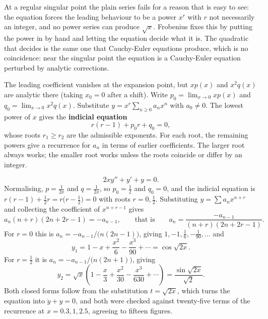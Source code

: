 At a regular singular point the plain series fails for a reason that is easy to see: the equation forces the leading behaviour to be a power $x^{r}$ with $r$ not necessarily an integer, and no power series can produce $\sqrt{x}$. Frobenius fixes this by putting the power in by hand and letting the equation decide what it is. The quadratic that decides is the same one that Cauchy-Euler equations produce, which is no coincidence: near the singular point the equation is a Cauchy-Euler equation perturbed by analytic corrections.

\cue The leading coefficient vanishes at the expansion point, but $xp(x)$ and $x^{2}q(x)$ are analytic there (taking $x_0=0$ after a shift).
\method Write $p_0=\lim_{x\to0}xp(x)$ and $q_0=\lim_{x\to0}x^{2}q(x)$. Substitute $y=x^{r}\sum_{n\ge0}a_nx^{n}$ with $a_0\ne0$. The lowest power of $x$ gives the \textbf{indicial equation}
\[r(r-1)+p_0r+q_0=0,\]
whose roots $r_1\ge r_2$ are the admissible exponents. For each root, the remaining powers give a recurrence for $a_n$ in terms of earlier coefficients. The larger root always works; the smaller root works unless the roots coincide or differ by an integer.

\begin{worked}
\[2xy''+y'+y=0.\]
Normalising, $p=\tfrac1{2x}$ and $q=\tfrac1{2x}$, so $p_0=\tfrac12$ and $q_0=0$, and the indicial equation is $r(r-1)+\tfrac12r=r\bigl(r-\tfrac12\bigr)=0$ with roots $r=0,\tfrac12$. Substituting $y=\sum a_nx^{n+r}$ and collecting the coefficient of $x^{n+r-1}$ gives
\[a_n(n+r)(2n+2r-1)=-a_{n-1},\qquad\text{that is}\qquad a_n=\frac{-a_{n-1}}{(n+r)(2n+2r-1)}.\]
For $r=0$ this is $a_n=-a_{n-1}/\bigl(n(2n-1)\bigr)$, giving $1,-1,\tfrac16,-\tfrac1{90},\dots$ and
\[y_1=1-x+\frac{x^{2}}{6}-\frac{x^{3}}{90}+\cdots=\cos\sqrt{2x}.\]
For $r=\tfrac12$ it is $a_n=-a_{n-1}/\bigl(n(2n+1)\bigr)$, giving
\[y_2=\sqrt{x}\left(1-\frac x3+\frac{x^{2}}{30}-\frac{x^{3}}{630}+\cdots\right)=\frac{\sin\sqrt{2x}}{\sqrt2}.\]
Both closed forms follow from the substitution $t=\sqrt{2x}$, which turns the equation into $\ddot y+y=0$, and both were checked against twenty-five terms of the recurrence at $x=0.3,1,2.5$, agreeing to fifteen figures.
\end{worked}


